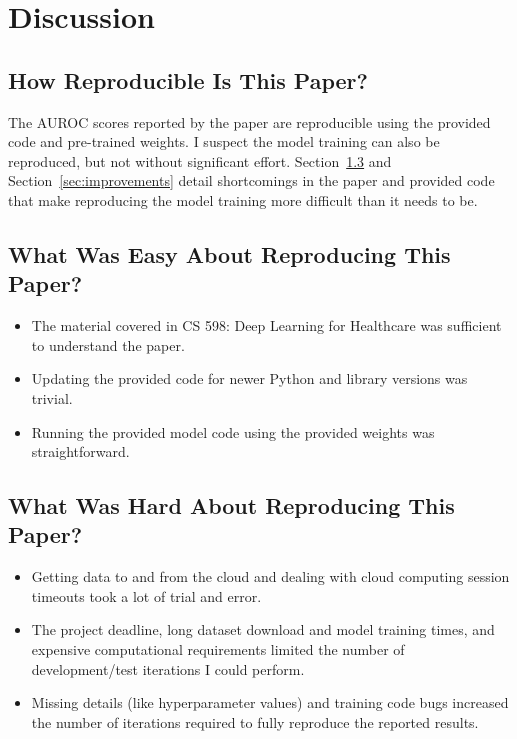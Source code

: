 \documentclass[letterpaper]{article} %
\begin{document}
\section{Discussion}

\subsection{How Reproducible Is This Paper?}

The AUROC scores reported by the paper are reproducible using the provided code and pre-trained weights. I suspect the model training can also be reproduced, but not without significant effort. Section~\ref{sec:hard} and Section~\ref{sec:improvements} detail shortcomings in the paper and provided code that make reproducing the model training more difficult than it needs to be.

\subsection{What Was Easy About Reproducing This Paper?}

\begin{itemize}
    \item The material covered in CS 598: Deep Learning for Healthcare was sufficient to understand the paper.
    \item Updating the provided code for newer Python and library versions was trivial.
    \item Running the provided model code using the provided weights was straightforward.
\end{itemize}

\subsection{What Was Hard About Reproducing This Paper?}
\label{sec:hard}

\begin{itemize}
    \item Getting data to and from the cloud and dealing with cloud computing session timeouts took a lot of trial and error.
    \item The project deadline, long dataset download and model training times, and expensive computational requirements limited the number of development/test iterations I could perform.
    \item Missing details (like hyperparameter values) and training code bugs increased the number of iterations required to fully reproduce the reported results.
\end{itemize}
\end{document}

